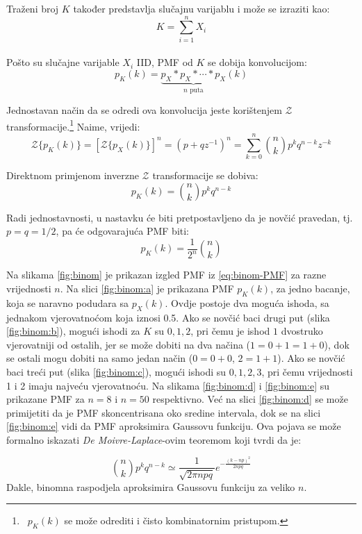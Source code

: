 Traženi broj $K$ također predstavlja slučajnu varijablu i može se izraziti
kao:
$$K = \sum_{i=1}^{n} X_i$$
\\

Pošto su slučajne varijable $X_i$ IID, PMF od $K$ se dobija konvolucijom:
$$p_K(k) = \underbrace{p_X * p_X * \cdots * p_X}_{n\text{ puta}}(k)$$

Jednostavan način da se odredi ova konvolucija jeste korištenjem
$\mathcal{Z}$ transformacije.\footnote{\ $p_K(k)$ se može odrediti i čisto
kombinatornim pristupom.}
Naime, vrijedi:
\begin{equation}
  \mathcal{Z}\{p_K(k)\}
  = \left[\mathcal{Z}\{p_X(k)\}\right]^n
  = (p+qz^{-1})^n
  = \sum_{k=0}^{n} \binom{n}{k} p^k q^{n-k} z^{-k}
\end{equation}

Direktnom primjenom inverzne $ \mathcal{Z}$ transformacije se dobiva:
\begin{equation}
  p_K(k) = \binom{n}{k} p^kq^{n-k}
\end{equation}

Radi jednostavnosti, u nastavku će biti pretpostavljeno da je novčić pravedan,
tj. $p=q=1/2$, pa će odgovarajuća PMF biti:
\begin{equation} \label{eq:binom-PMF}
  p_K(k) = \frac{1}{2^n} \binom{n}{k}
\end{equation}

Na slikama \ref{fig:binom} je prikazan izgled PMF iz \eqref{eq:binom-PMF} za
razne vrijednosti $n$.  Na slici \ref{fig:binom:a} je prikazana PMF $p_K(k)$, za
jedno bacanje, koja se naravno podudara sa $p_X(k)$. Ovdje postoje dva moguća
ishoda, sa jednakom vjerovatnoćom koja iznosi 0.5. Ako se novčić baci drugi put
(slika \ref{fig:binom:b}), mogući ishodi za $K$ su $0, 1, 2$, pri čemu je ishod
$1$ dvostruko vjerovatniji od ostalih, jer se može dobiti na dva načina
($1=0+1=1+0$), dok se ostali mogu dobiti na samo jedan način ($0=0+0$, $2=1+1$).
Ako se novčić baci treći put (slika \ref{fig:binom:c}), mogući ishodi su
$0,1,2,3$, pri čemu vrijednosti 1 i 2 imaju najveću vjerovatnoću. Na slikama
\ref{fig:binom:d} i \ref{fig:binom:e} su prikazane PMF za $n=8$ i $n=50$
respektivno. Već na slici \ref{fig:binom:d} se može primijetiti da je PMF
skoncentrisana oko sredine intervala, dok se na slici \ref{fig:binom:e} vidi da
PMF aproksimira Gaussovu funkciju. Ova pojava se može formalno iskazati
\textit{De Moivre-Laplace}-ovim teoremom koji tvrdi da je:

\begin{equation}
  \binom{n}{k}p^kq^{n-k} \simeq \frac{1}{\sqrt{2\pi npq}}
  e^{-\frac{(k-np)^2}{2npq}}
\end{equation}
Dakle, binomna raspodjela aproksimira Gaussovu funkciju za veliko $n$. \\

